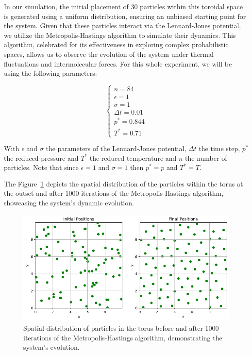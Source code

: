 \documentclass{article}
\begin{document}
In our simulation, the initial placement of 30 particles within this toroidal space is generated using a uniform distribution, ensuring an unbiased starting point for the system. Given that these particles interact via the Lennard-Jones potential, we utilize the Metropolis-Hastings algorithm to simulate their dynamics. This algorithm, celebrated for its effectiveness in exploring complex probabilistic spaces, allows us to observe the evolution of the system under thermal fluctuations and intermolecular forces. For this whole experiment, we will be using the following parameters:

\[
	\begin{cases}
		n = 84 \\
		\epsilon = 1 \\
		\sigma = 1 \\
		\Delta t = 0.01 \\
		p^{*} = 0.844 \\
		T^{*} = 0.71
	\end{cases}
\]

With \( \epsilon \) and \( \sigma \) the parameters of the Lennard-Jones potential, \( \Delta t \) the time step, \( p^{*} \) the reduced pressure and \( T^{*} \) the reduced temperature and \(n\) the number of particles. Note that since \(\epsilon = 1 \) and \( \sigma = 1\) then \(p^{*} = p\) and \(T^{*} = T\).

The Figure~\ref{fig:particlesmh} depicts the spatial distribution of the particles within the torus at the outset and after 1000 iterations of the Metropolis-Hastings algorithm, showcasing the system's dynamic evolution.

\begin{figure}[H]
	\centering
	\includegraphics[width=0.75\linewidth]{./Figures/MCMC/LennardJones/particles.png}
	\caption{Spatial distribution of particles in the torus before and after 1000 iterations of the Metropolis-Hastings algorithm, demonstrating the system's evolution.}
	\label{fig:particlesmh}
\end{figure}
\end{document}
